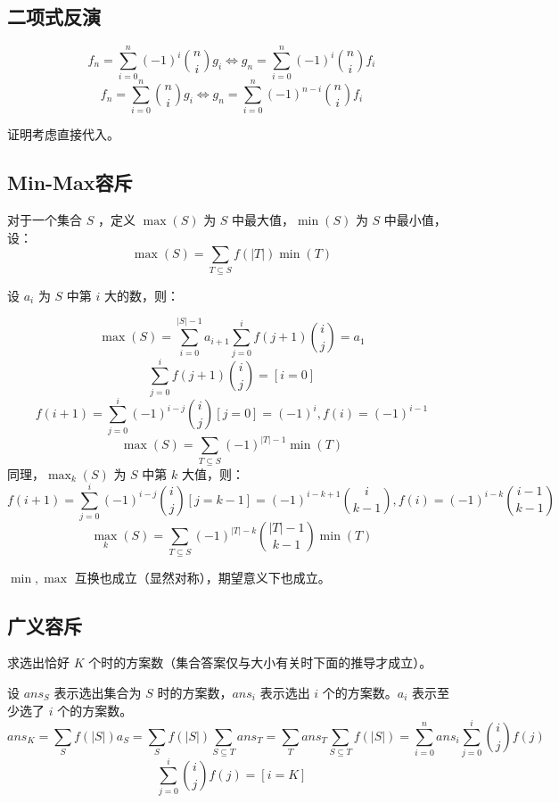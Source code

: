 \subsection{二项式反演}

$$
f_n = \sum_{i=0}^n (-1)^i {n \choose i} g_i \Leftrightarrow g_n = \sum_{i=0}^n (-1)^i {n \choose i} f_i
$$
$$
f_n = \sum_{i=0}^n {n \choose i} g_i \Leftrightarrow g_n = \sum_{i=0}^n (-1)^{n-i} {n \choose i} f_i
$$

证明考虑直接代入。

\subsection{Min-Max容斥}

对于一个集合 $S$ ，定义 $\max(S)$ 为 $S$ 中最大值，$\min(S)$ 为 $S$ 中最小值，设：
$$
\max(S)=\sum_{T\subseteq S}f(|T|)\min(T)
$$

\vspace{-0.3cm}

设 $a_i$ 为 $S$ 中第 $i$ 大的数，则：

\vspace{-0.3cm}

$$
\max(S)=\sum_{i=0}^{|S|-1}a_{i+1}\sum_{j=0}^{i}f(j+1){i\choose j}=a_1
$$
$$
\sum_{j=0}^{i}f(j+1){i\choose j}=[i=0]
$$
$$
f(i+1)=\sum_{j=0}^{i}(-1)^{i-j}{i\choose j}[j=0]=(-1)^{i},f(i)=(-1)^{i-1}
$$
$$
\max(S)=\sum_{T\subseteq S}(-1)^{|T|-1}\min(T)
$$
同理，$\max_{k}(S)$ 为 $S$ 中第 $k$ 大值，则：
$$
f(i+1)=\sum_{j=0}^{i}(-1)^{i-j}{i\choose j}[j=k-1]=(-1)^{i-k+1}{i\choose k-1},f(i)=(-1)^{i-k}{i-1\choose k-1}
$$
$$
\max_k(S)=\sum_{T\subseteq S}(-1)^{|T|-k}{|T|-1\choose k-1}\min(T)
$$

$\min,\max$ 互换也成立（显然对称），期望意义下也成立。


\subsection{广义容斥}

求选出恰好 $K$ 个时的方案数（集合答案仅与大小有关时下面的推导才成立）。

设 $ans_S$ 表示选出集合为 $S$ 时的方案数，$ans_i$ 表示选出 $i$ 个的方案数。$a_i$ 表示至少选了 $i$ 个的方案数。
$$
ans_K=\sum_{S}f(|S|)a_S=\sum_{S}f(|S|)\sum_{S\subseteq T}ans_{T}=\sum_{T}ans_T\sum_{S\subseteq T}f(|S|)=\sum_{i=0}^{n}ans_i\sum_{j=0}^{i}{i\choose j}f(j)
$$
$$
\sum_{j=0}^{i}{i\choose j}f(j)=[i=K]
$$

\vspace{-0.4cm}

